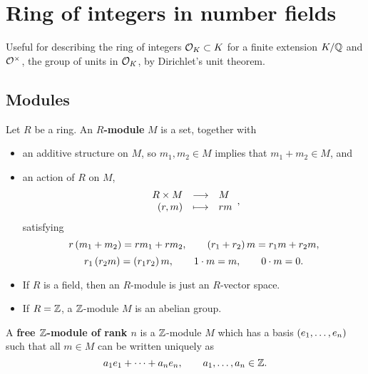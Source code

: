 \pagebreak

\section{Ring of integers in number fields}


Useful for describing the ring of integers $ \mathcal{O}_K \subset K $ for a finite extension $ K / \mathbb{Q} $ and $ \mathcal{O}^\times $, the group of units in $ \mathcal{O}_K $, by Dirichlet's unit theorem.

\subsection{Modules}

\begin{definition}
Let $ R $ be a ring. An \textbf{$ R $-module} $ M $ is a set, together with
\begin{itemize}
\item an additive structure on $ M $, so $ m_1, m_2 \in M $ implies that $ m_1 + m_2 \in M $, and
\item an action of $ R $ on $ M $,
$$ \function{R \times M}{M}{\br{r, m}}{rm}, $$
satisfying
$$ r\br{m_1 + m_2} = rm_1 + rm_2, \qquad \br{r_1 + r_2}m = r_1m + r_2m, $$
$$ r_1\br{r_2m} = \br{r_1r_2}m, \qquad 1 \cdot m = m, \qquad 0 \cdot m = 0. $$
\end{itemize}
\end{definition}

\begin{note*}
\hfill
\begin{itemize}
\item If $ R $ is a field, then an $ R $-module is just an $ R $-vector space.
\item If $ R = \mathbb{Z} $, a $ \mathbb{Z} $-module $ M $ is an abelian group.
\end{itemize}
\end{note*}

\begin{definition}
A \textbf{free $ \mathbb{Z} $-module of rank $ n $} is a $ \mathbb{Z} $-module $ M $ which has a basis $ \br{e_1, \dots, e_n} $ such that all $ m \in M $ can be written uniquely as
$$ a_1e_1 + \dots + a_ne_n, \qquad a_1, \dots, a_n \in \mathbb{Z}. $$
\end{definition}

